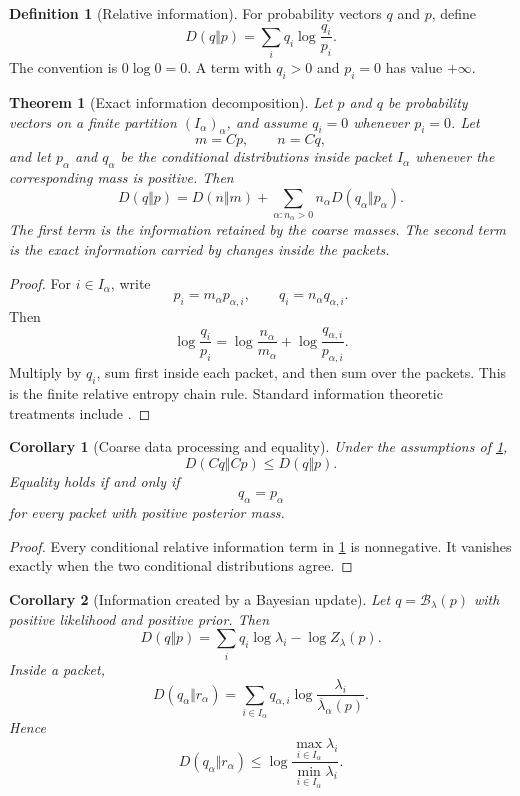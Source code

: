 \documentclass{aomart}
\newtheorem{theorem}{Theorem}[section]
\newtheorem{corollary}[corollary]{Corollary}
\theoremstyle{definition}
\newtheorem{definition}[definition]{Definition}
\theoremstyle{remark}
\newcommand{\Bcal}{\mathcal B}
\begin{document}
\begin{definition}[Relative information]
For probability vectors \(q\) and \(p\), define
\[
D(q\Vert p)
=
\sum_iq_i\log\frac{q_i}{p_i}.
\]
The convention is \(0\log0=0\). A term with \(q_i>0\) and \(p_i=0\) has value \(+\infty\).
\end{definition}

\begin{theorem}[Exact information decomposition]\label{thm:bayesian_information_chain}
Let \(p\) and \(q\) be probability vectors on a finite partition \((I_\alpha)_\alpha\), and assume \(q_i=0\) whenever \(p_i=0\). Let
\[
m=Cp,
\qquad
n=Cq,
\]
and let \(p_\alpha\) and \(q_\alpha\) be the conditional distributions inside packet \(I_\alpha\) whenever the corresponding mass is positive. Then
\[
D(q\Vert p)
=
D(n\Vert m)
+
\sum_{\alpha:n_\alpha>0}
 n_\alpha D(q_\alpha\Vert p_\alpha).
\]
The first term is the information retained by the coarse masses. The second term is the exact information carried by changes inside the packets.
\end{theorem}

\begin{proof}
For \(i\in I_\alpha\), write
\[
p_i=m_\alpha p_{\alpha,i},
\qquad
q_i=n_\alpha q_{\alpha,i}.
\]
Then
\[
\log\frac{q_i}{p_i}
=
\log\frac{n_\alpha}{m_\alpha}
+
\log\frac{q_{\alpha,i}}{p_{\alpha,i}}.
\]
Multiply by \(q_i\), sum first inside each packet, and then sum over the packets. This is the finite relative entropy chain rule. Standard information theoretic treatments include \cite{CoverThomas2006}.
\end{proof}

\begin{corollary}[Coarse data processing and equality]\label{cor:coarse_data_processing}
Under the assumptions of \cref{thm:bayesian_information_chain},
\[
D(Cq\Vert Cp)
\leq
D(q\Vert p).
\]
Equality holds if and only if
\[
q_\alpha=p_\alpha
\]
for every packet with positive posterior mass.
\end{corollary}

\begin{proof}
Every conditional relative information term in \cref{thm:bayesian_information_chain} is nonnegative. It vanishes exactly when the two conditional distributions agree.
\end{proof}

\begin{corollary}[Information created by a Bayesian update]\label{cor:bayesian_information_gain}
Let \(q=\Bcal_\lambda(p)\) with positive likelihood and positive prior. Then
\[
D(q\Vert p)
=
\sum_iq_i\log\lambda_i
-
\log Z_\lambda(p).
\]
Inside a packet,
\[
D(q_\alpha\Vert r_\alpha)
=
\sum_{i\in I_\alpha}
q_{\alpha,i}
\log\frac{\lambda_i}{\overline\lambda_\alpha(p)}.
\]
Hence
\[
D(q_\alpha\Vert r_\alpha)
\leq
\log
\frac{\max_{i\in I_\alpha}\lambda_i}
{\min_{i\in I_\alpha}\lambda_i}.
\]
\end{corollary}
\end{document}
